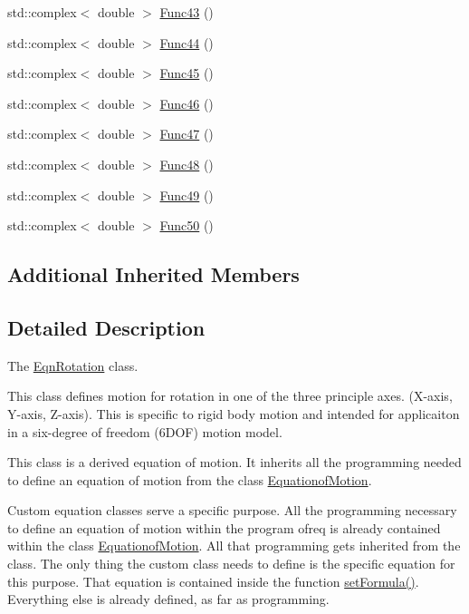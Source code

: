 \begin{DoxyCompactItemize}
\item 
std\-::complex$<$ double $>$ \hyperlink{classosea_1_1ofreq_1_1_eqn_rotation_a608753b6196be411749399dfe6c564b4}{Func43} ()
\item 
std\-::complex$<$ double $>$ \hyperlink{classosea_1_1ofreq_1_1_eqn_rotation_af67a3200196199215bbce93c9efc50cf}{Func44} ()
\item 
std\-::complex$<$ double $>$ \hyperlink{classosea_1_1ofreq_1_1_eqn_rotation_aa1a15e9f3c3dcf38147d8f097b89d4b2}{Func45} ()
\item 
std\-::complex$<$ double $>$ \hyperlink{classosea_1_1ofreq_1_1_eqn_rotation_a4d3309b35331f3eb0e1838694e501283}{Func46} ()
\item 
std\-::complex$<$ double $>$ \hyperlink{classosea_1_1ofreq_1_1_eqn_rotation_a8d7d1b3cceb79509f52352aa88d2780d}{Func47} ()
\item 
std\-::complex$<$ double $>$ \hyperlink{classosea_1_1ofreq_1_1_eqn_rotation_aab3be2b71a3aaeea29ce704bace8a6a1}{Func48} ()
\item 
std\-::complex$<$ double $>$ \hyperlink{classosea_1_1ofreq_1_1_eqn_rotation_aa671d1bfbbc58ffd0fac10313fba487c}{Func49} ()
\item 
std\-::complex$<$ double $>$ \hyperlink{classosea_1_1ofreq_1_1_eqn_rotation_a701980d976bf59b9765f73834cd54e80}{Func50} ()
\end{DoxyCompactItemize}
\subsection*{Additional Inherited Members}


\subsection{Detailed Description}
The \hyperlink{classosea_1_1ofreq_1_1_eqn_rotation}{Eqn\-Rotation} class. 

This class defines motion for rotation in one of the three principle axes. (X-\/axis, Y-\/axis, Z-\/axis). This is specific to rigid body motion and intended for applicaiton in a six-\/degree of freedom (6\-D\-O\-F) motion model. 

 This class is a derived equation of motion. It inherits all the programming needed to define an equation of motion from the class \hyperlink{classosea_1_1ofreq_1_1_equationof_motion}{Equationof\-Motion}.

Custom equation classes serve a specific purpose. All the programming necessary to define an equation of motion within the program ofreq is already contained within the class \hyperlink{classosea_1_1ofreq_1_1_equationof_motion}{Equationof\-Motion}. All that programming gets inherited from the class. The only thing the custom class needs to define is the specific equation for this purpose. That equation is contained inside the function \hyperlink{classosea_1_1ofreq_1_1_eqn_rotation_a910975e9e2e8d438853a4e7d658850a8}{set\-Formula()}. Everything else is already defined, as far as programming.

